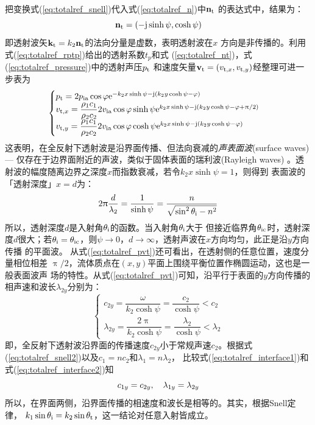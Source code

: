 \documentclass[UTF8]{ctexbook}
\begin{document}
把变换式(\ref{eq:totalref_snell})代入式(\ref{eq:totalref_n})中$\vb{n}_\text{t}$
的表达式中，结果为：
\begin{equation}
\vb{n}_\text{t} = (-\mathrm{j} \sinh \psi, \cosh\psi)
\label{eq:totalref_nt}
\end{equation}
即透射波矢$\vb{k}_\text{t} = k_2\vb{n}_\text{t}$的法向分量是虚数，表明透射波在$x$
方向是非传播的。利用式(\ref{eq:totalref_rptp})给出的透射系数$t_p$和式
(\ref{eq:totalref_nt})，式(\ref{eq:totalref_pressure})中的透射声压$p_\text{t}$
和速度矢量$\vb{v}_\text{t}=(v_{\mathrm{t,} x}, v_{\mathrm{t,} y})$经整理可进一步表为
\begin{equation}
	\label{eq:totalref_pvt}
	\begin{cases}
		p_\text{t} = 2p_\text{ia} \cos \varphi \mathrm{e}^{-k_2x\sinh \psi - \mathrm{j} (k_2 y
		\cosh \psi -\varphi)}\\
		v_{\mathrm{t,}x} = \dfrac{\rho_1c_1}{\rho_2c_2} 2v_\text{ia} \cos\varphi
		\sinh \psi \mathrm{e}^{k_2x\sinh \psi - \mathrm{j}\qty(k_2y\cosh \psi -\varphi
		+\uppi/2)}\\
		v_{\mathrm{t,}y} = \dfrac{\rho_1c_1}{\rho_2c_2} 2v_\text{ia} \cos\varphi
		\cosh \psi \mathrm{e}^{k_2x\sinh \psi - \mathrm{j}\qty(k_2y\cosh \psi -\varphi
		)}
	\end{cases}
\end{equation}
这表明，在全反射下透射波是沿界面传播、但法向衰减的\emph{声表面波}(surface
waves) --- 仅存在于边界面附近的声波，类似于固体表面的瑞利波(Rayleigh waves)
。透射波的幅度随离边界之深度$x$而指数衰减，若令$k_2x\sinh \psi = 1$，则得到
表面波的「透射深度」$x=d$为：
\begin{equation}
	2\uppi \frac{d}{\lambda_2} = \frac{1}{\sinh\psi} = \frac{n}{\sqrt{
		\sin^2\theta_\text{i}-n^2}}
\end{equation}
所以，透射深度$d$是入射角$\theta_\text{i}$的函数。当入射角$\theta_\text{i}$大于
但接近临界角$\theta_\text{ic}$时，透射深度$d$很大；若$\theta_\text{i}=\theta_\text{ic}
$，则$\psi\to0$，$d \to \infty$，透射声波在$x$方向均匀，此正是沿$y$方向传播
的平面波。
从式(\ref{eq:totalref_pvt})还可看出，在透射侧的任意位置，速度分量相位相差
$\uppi/2$，流体质点在$(x,y)$平面上围绕平衡位置作椭圆运动，这也是一般表面波声
场的特性。从式(\ref{eq:totalref_pvt})可知，沿平行于表面的$y$方向传播的
相声速和波长$\lambda_{2y}$分别为：
\begin{equation}
	\label{eq:totalref_interface2}
	\begin{cases}
		c_{2y} = \dfrac{\omega}{k_2\cosh\psi} = \dfrac{c_2}{\cosh\psi}<c_2\\
		\lambda_{2y} = \dfrac{2\uppi}{k_2\cosh \psi} = \dfrac{
		\lambda_2}{\cosh \psi} <\lambda_2
	\end{cases}
\end{equation}
即，全反射下透射波沿界面的传播速度$c_{2y}$小于常规声速$c_2$。根据式
(\ref{eq:totalref_snell2})以及$c_1=nc_2$和$\lambda_1 = n\lambda_2$，
比较式(\ref{eq:totalref_interface1})和式(\ref{eq:totalref_interface2})知
$$
c_{1y} = c_{2y} \qc \lambda_{1y}=\lambda_{2y}
$$
所以，在界面两侧，沿界面传播的相速度和波长是相等的。其实，根据Snell定律，
$k_1\sin\theta_\text{i} = k_2\sin\theta_\text{t}$，这一结论对任意入射皆成立。
 
\end{document}
